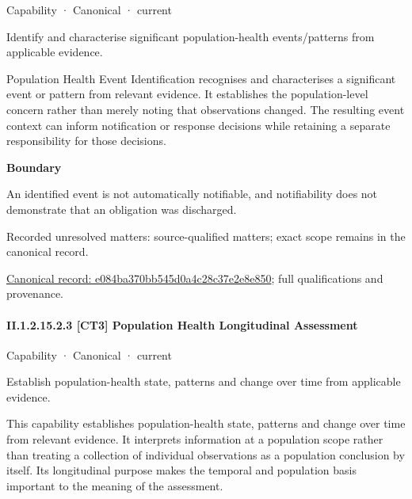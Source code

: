 \label{element:e084ba370bb545d0a4c28c37e2e8e850}
{\small Capability · Canonical · current}\par

Identify and characterise significant population-health events/patterns from applicable evidence.



Population Health Event Identification recognises and characterises a significant event or pattern from relevant evidence. It establishes the population-level concern rather than merely noting that observations changed. The resulting event context can inform notification or response decisions while retaining a separate responsibility for those decisions.



\textbf{Boundary}



An identified event is not automatically notifiable, and notifiability does not demonstrate that an obligation was discharged.


{\small Recorded unresolved matters: source-qualified matters; exact scope remains in the canonical record.}\par
{\footnotesize \href{../../../../../../../continuum/strategy/capability/e084ba370bb545d0a4c28c37e2e8e850.md}{Canonical record: e084ba370bb545d0a4c28c37e2e8e850}; full qualifications and provenance.}\par
\paragraph*{II.1.2.15.2.3 [CT3] Population Health Longitudinal Assessment}
\label{navigation:II.1.2.15.2.3}

\label{element:4d52b8acda504329a595be27a736e63c}
{\small Capability · Canonical · current}\par

Establish population-health state, patterns and change over time from applicable evidence.



This capability establishes population-health state, patterns and change over time from relevant evidence. It interprets information at a population scope rather than treating a collection of individual observations as a population conclusion by itself. Its longitudinal purpose makes the temporal and population basis important to the meaning of the assessment.



